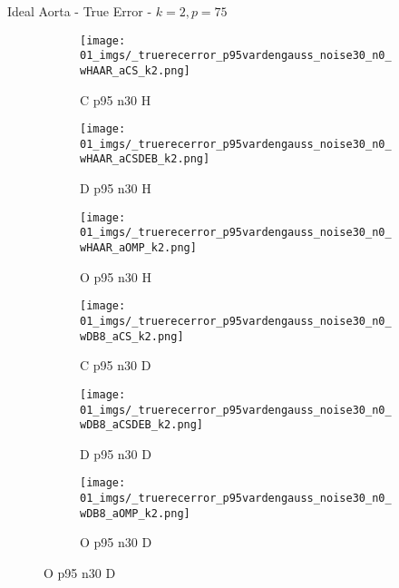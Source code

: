 \begin{frame}{Ideal Aorta - True Error - $k=2,p=75$}{}
\begin{figure}
\begin{subfigure}{0.13\textwidth}
\texttt{[image: 01\_imgs/\_truerecerror\_p95vardengauss\_noise30\_n0\_wHAAR\_aCS\_k2.png]}
\caption*{\tiny C p95 n30 H}
\end{subfigure}
\begin{subfigure}{0.13\textwidth}
\texttt{[image: 01\_imgs/\_truerecerror\_p95vardengauss\_noise30\_n0\_wHAAR\_aCSDEB\_k2.png]}
\caption*{\tiny D p95 n30 H}
\end{subfigure}
\begin{subfigure}{0.13\textwidth}
\texttt{[image: 01\_imgs/\_truerecerror\_p95vardengauss\_noise30\_n0\_wHAAR\_aOMP\_k2.png]}
\caption*{\tiny O p95 n30 H}
\end{subfigure}
\begin{subfigure}{0.13\textwidth}
\texttt{[image: 01\_imgs/\_truerecerror\_p95vardengauss\_noise30\_n0\_wDB8\_aCS\_k2.png]}
\caption*{\tiny C p95 n30 D}
\end{subfigure}
\begin{subfigure}{0.13\textwidth}
\texttt{[image: 01\_imgs/\_truerecerror\_p95vardengauss\_noise30\_n0\_wDB8\_aCSDEB\_k2.png]}
\caption*{\tiny D p95 n30 D}
\end{subfigure}
\begin{subfigure}{0.13\textwidth}
\texttt{[image: 01\_imgs/\_truerecerror\_p95vardengauss\_noise30\_n0\_wDB8\_aOMP\_k2.png]}
\caption*{\tiny O p95 n30 D}
\end{subfigure}
\end{figure}
\end{frame}
